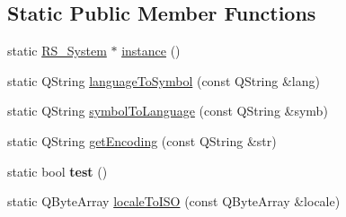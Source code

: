 \subsection*{Static Public Member Functions}
\begin{DoxyCompactItemize}
\item 
static \hyperlink{classRS__System}{R\-S\-\_\-\-System} $\ast$ \hyperlink{classRS__System_abc000967d6c96c8011146bd82c9a6594}{instance} ()
\item 
static Q\-String \hyperlink{classRS__System_a0fe0708127e7e142e08e9646eaa9d05a}{language\-To\-Symbol} (const Q\-String \&lang)
\item 
static Q\-String \hyperlink{classRS__System_a9960c35db080fe160a2baa2a55623c28}{symbol\-To\-Language} (const Q\-String \&symb)
\item 
static Q\-String \hyperlink{classRS__System_a3e9cce6dc630433b3311acfc1d925bc5}{get\-Encoding} (const Q\-String \&str)
\item 
\hypertarget{classRS__System_a3d98bc7a4780043adf068bdf459f97e3}{static bool {\bfseries test} ()}\label{classRS__System_a3d98bc7a4780043adf068bdf459f97e3}

\item 
static Q\-Byte\-Array \hyperlink{classRS__System_ad35c509c2e0be808daf12246a265675f}{locale\-To\-I\-S\-O} (const Q\-Byte\-Array \&locale)
\end{DoxyCompactItemize}

